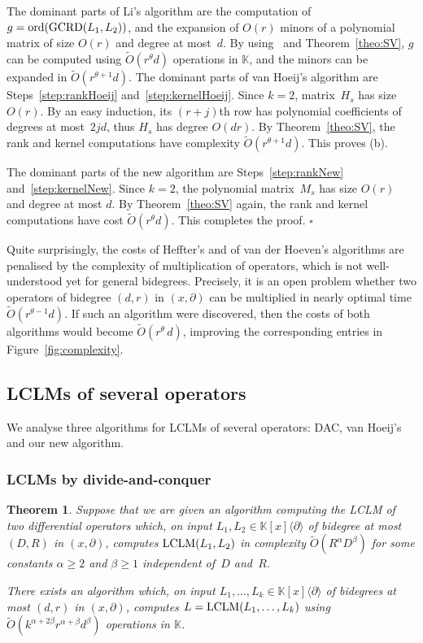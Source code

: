 \documentclass{sig-alt-full}
\def\foorp{\hfill$\square$}
\def\K {\ensuremath{\mathbb{K}}}
\newcommand{\x}{x}
\newcommand{\Dx}{\partial}
\newcommand{\ord} { {\rm ord}}
\newcommand{\lclm} { {\rm LCLM}}
\newcommand{\bigOsoft}{\widetilde{{O}}}
\newtheorem{theorem}{Theorem}
\begin{document}
The dominant parts of Li's algorithm are the computation of $g=\ord(
\text{GCRD}(L_1,L_2))$, and the expansion of $O(r)$ minors of a polynomial matrix of size $O(r)$ and degree at most~$d$. By using~\cite[Lemma~5.1]{Grigoriev90} and Theorem~\ref{theo:SV}, $g$ can be computed using $\bigOsoft(r^\theta d)$ operations in $\K$, and the minors can be expanded in  $\bigOsoft(r^{\theta +1} d)$.
The dominant parts of van Hoeij's algorithm are
Steps~\ref{step:rankHoeij} and~\ref{step:kernelHoeij}.
Since $k=2$, matrix~$H_s$ has size $O(r)$. By an easy induction, its $(r+j)$th row has polynomial coefficients of degrees at most~$2jd$, thus $H_s$ has degree $O(dr)$. By Theorem~\ref{theo:SV}, the rank and kernel computations have complexity $\bigOsoft(r^{\theta+1}d)$. This proves (b).

The dominant parts of the new algorithm are
Steps~\ref{step:rankNew} and~\ref{step:kernelNew}. Since $k=2$, the polynomial matrix~$M_s$ has size $O(r)$ and degree at most $d$. By Theorem~\ref{theo:SV} again, the rank and kernel computations have cost $\bigOsoft(r^{\theta}d)$. This completes the proof.
\foorp

Quite surprisingly, the costs of Heffter's and of van der Hoeven's
algorithms are penalised by the complexity of multiplication of operators,
which is not well-understood yet for general bidegrees. Precisely,
it is an open problem whether two operators of bidegree $(d,r)$ in
$(x,\partial)$ can be multiplied in nearly optimal time $\bigOsoft(
r^{\theta-1} d)$. If such an algorithm were discovered, then the costs of both
algorithms would become $\bigOsoft(r^{\theta} \, d)$, improving the
corresponding entries in Figure~\ref{fig:complexity}.

\subsection{LCLMs of several operators} \label{ssec:cost-sev} 
We analyse three algorithms for LCLMs of several operators: 
DAC, van Hoeij's and our new algorithm. 

\subsubsection{LCLMs by divide-and-conquer} \label{ssec:iter}

\vspace{-0.2cm}

\begin{theorem} \label{theo:DAC}
	Suppose that we are given an algorithm  computing the LCLM
of two differential operators which, on input $L_1,L_2 \in \K[\x]\langle
\Dx\rangle$ of bidegree at most $(D,R)$ in $(x,\Dx)$, computes $\lclm(L_1,L_2)$
in complexity $\bigOsoft (R^\alpha D^\beta)$ for some constants $\alpha \geq
2$ and $\beta \geq 1$ independent of~$D$ and~$R$. 

There exists an algorithm which, on input $L_1,\ldots, L_k \in \K[\x]\langle
\Dx\rangle$ of bidegrees at most $(d,r)$ in $(x,\Dx)$, computes $L = \lclm(L_1,\ldots,L_k)$ using $\bigOsoft (k^{\alpha+2\beta} r^{\alpha+\beta} d^\beta)$ operations in $\K$.
\end{theorem}
\end{document}
